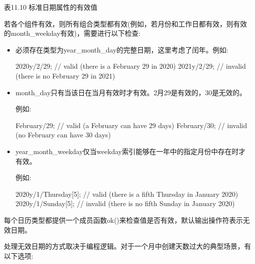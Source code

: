 \begin{center}
表11.10 标准日期属性的有效值
\end{center}

若各个组件有效，则所有组合类型都有效(例如，若月份和工作日都有效，则有效的month\_weekday有效)，需要进行以下检查:

\begin{itemize}
\item
必须存在类型为year\_month\_day的完整日期，这里考虑了闰年。例如:

\begin{cpp}
2020y/2/29; // valid (there is a February 29 in 2020)
2021y/2/29; // invalid (there is no February 29 in 2021)
\end{cpp}

\item
month\_day只有当该日在当月有效时才有效。2月29是有效的，30是无效的。

例如:

\begin{cpp}
February/29; // valid (a February can have 29 days)
February/30; // invalid (no February can have 30 days)
\end{cpp}

\item
year\_month\_weekday仅当weekday索引能够在一年中的指定月份中存在时才有效。

例如:

\begin{cpp}
2020y/1/Thursday[5]; // valid (there is a fifth Thursday in January 2020)
2020y/1/Sunday[5]; // invalid (there is no fifth Sunday in January 2020)
\end{cpp}
\end{itemize}

每个日历类型都提供一个成员函数ok()来检查值是否有效，默认输出操作符表示无效日期。

处理无效日期的方式取决于编程逻辑。对于一个月中创建天数过大的典型场景，有以下选项:

